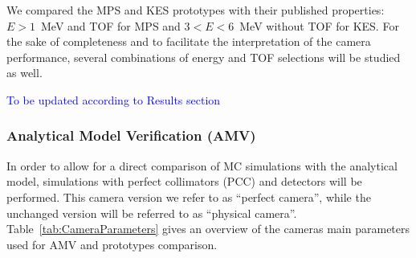 \documentclass[a4paper,english,12pt]{article}
\newcommand{\qq}[1]{\enquote{#1}}
\newcommand{\et}[2][blue]{\textcolor{#1}{#2}}
\begin{document}
We compared the MPS and KES prototypes with their published properties: $E>1$~MeV and TOF for MPS and $3<E<6$~MeV without TOF for KES. For the sake of completeness and to facilitate the interpretation of the camera performance, several combinations of energy and TOF selections will be studied as well.

\et{To be updated according to Results section}

\subsubsection{Analytical Model Verification (AMV)}

In order to allow for a direct comparison of MC simulations with the analytical model, simulations with perfect collimators (PCC) and detectors will be performed. This camera version we refer to as \qq{perfect camera}, while the unchanged version will be referred to as \qq{physical camera}. Table~\ref{tab:CameraParameters} gives an overview of the cameras main parameters used for AMV and prototypes comparison.
\end{document}
